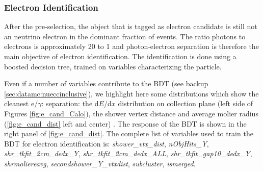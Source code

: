 \subsubsection{Electron Identification}
After the pre-selection, the object that is tagged as electron candidate is still not an neutrino electron in the dominant fraction of events. The ratio photons to electrons is approximately 20 to 1 and photon-electron separation is therefore the main objective of electron identification. The identification is done using a boosted decision tree, trained on variables characterizing the particle. 

Even if a number of variables contribute to the BDT (see backup \ref{sec:datamc:nueccinclusive}),  we highlight here some distributions which show the cleanest e/$\gamma$: separation: the  d$E$/d$x$ distribution on  collection plane (left side of Figures \ref{fig:e_cand_Calo}), the shower vertex distance and average molier radius (\cref{fig:e_cand_dist} left and center) . The response of the BDT is shown in the right panel of \cref{fig:e_cand_dist}. The complete list of variables used to train the BDT for electron identification is: \emph{shower\_vtx\_dist}, \emph{nObjHits\_Y},  \emph{shr\_tkfit\_2cm\_dedx\_Y},  \emph{shr\_tkfit\_2cm\_dedx\_ALL},  \emph{shr\_tkfit\_gap10\_dedx\_Y}, \emph{shrmoliereavg}, \emph{secondshower\_Y\_vtxdist}, \emph{subcluster}, \emph{ismerged}.

